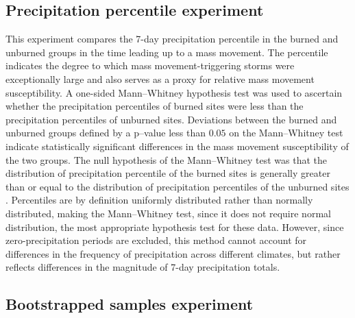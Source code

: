 \documentclass[nhess, manuscript]{copernicus}
\begin{document}
\subsection{Precipitation percentile experiment} \label{sec:method-percentile}

This experiment compares the 7-day precipitation percentile in the burned and unburned 
groups in the time leading up to a mass movement. The percentile indicates the degree to 
which mass movement-triggering storms were exceptionally large and also serves as a proxy 
for relative mass movement susceptibility. A one-sided Mann--Whitney hypothesis test was 
used to ascertain whether the precipitation percentiles of burned sites were less than 
the precipitation percentiles of unburned sites. Deviations between the burned and 
unburned groups defined by a p--value less than \(0.05\) on the Mann--Whitney test 
indicate statistically significant differences in the mass movement susceptibility of the 
two groups. The null hypothesis of the Mann–Whitney test was that the distribution 
of precipitation percentile of the burned sites is generally greater than or equal 
to the distribution of precipitation percentiles of the unburned sites \citep{helsel2020Statistical}. 
Percentiles are by definition uniformly distributed rather than normally distributed, 
making the Mann–Whitney test, since it does not require normal distribution, the most 
appropriate hypothesis test for these data. However, since zero-precipitation 
periods are excluded, this method cannot account for differences in the frequency 
of precipitation across different climates, but rather reflects differences in the magnitude 
of 7-day precipitation totals.


\subsection{Bootstrapped samples
experiment}\label{sec:method-bootstrap}
\end{document}
